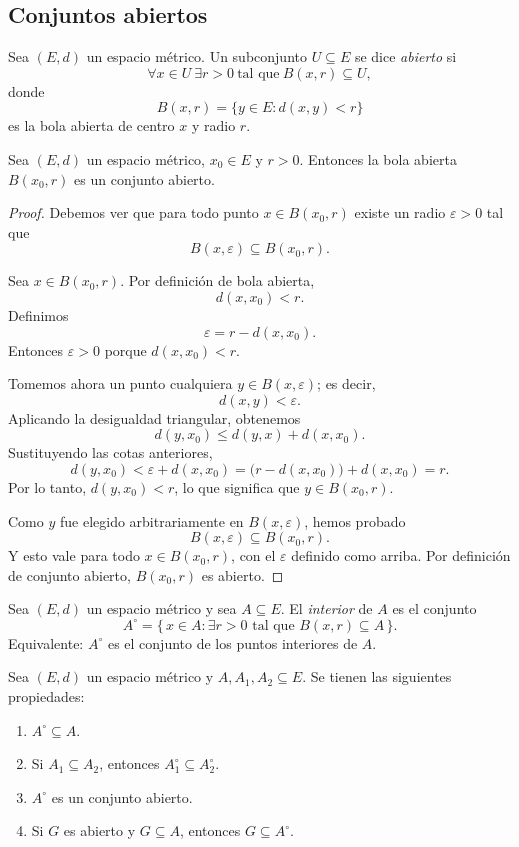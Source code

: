 \subsection{Conjuntos abiertos}

\begin{defi}
Sea $(E,d)$ un espacio métrico. Un subconjunto $U \subseteq E$ se dice
\emph{abierto} si
\[
\forall x \in U\ \exists r > 0 \ \text{tal que} \ B(x,r) \subseteq U,
\]
donde
\[
B(x,r) = \{y \in E : d(x,y) < r\}
\]
es la bola abierta de centro $x$ y radio $r$.
\end{defi}

\begin{prop}
Sea $(E,d)$ un espacio métrico, $x_0 \in E$ y $r>0$.
Entonces la bola abierta $B(x_0,r)$ es un conjunto abierto.
\end{prop}

\begin{proof}
Debemos ver que para todo punto $x \in B(x_0,r)$ existe un radio
$\varepsilon > 0$ tal que
\[
B(x,\varepsilon) \subseteq B(x_0,r).
\]

Sea $x \in B(x_0,r)$. Por definición de bola abierta,
\[
d(x,x_0) < r.
\]
Definimos
\[
\varepsilon = r - d(x,x_0).
\]
Entonces $\varepsilon > 0$ porque $d(x,x_0) < r$.

Tomemos ahora un punto cualquiera $y \in B(x,\varepsilon)$; es decir,
\[
d(x,y) < \varepsilon.
\]
Aplicando la desigualdad triangular, obtenemos
\[
d(y,x_0) \le d(y,x) + d(x,x_0).
\]
Sustituyendo las cotas anteriores,
\[
d(y,x_0) < \varepsilon + d(x,x_0)
= \bigl(r - d(x,x_0)\bigr) + d(x,x_0) = r.
\]
Por lo tanto, $d(y,x_0) < r$, lo que significa que $y \in B(x_0,r)$.

Como $y$ fue elegido arbitrariamente en $B(x,\varepsilon)$, hemos probado
\[
B(x,\varepsilon) \subseteq B(x_0,r).
\]
Y esto vale para todo $x \in B(x_0,r)$, con el $\varepsilon$ definido
como arriba. Por definición de conjunto abierto, $B(x_0,r)$ es abierto.
\end{proof}

\begin{defi}
Sea $(E,d)$ un espacio métrico y sea $A \subseteq E$.
El \emph{interior} de $A$ es el conjunto
\[
A^\circ = \{\,x \in A : \exists r>0 \text{ tal que } B(x,r) \subseteq A\,\}.
\]
Equivalente: $A^\circ$ es el conjunto de los puntos interiores de $A$.
\end{defi}

\begin{prop}
Sea $(E,d)$ un espacio métrico y $A,A_1,A_2 \subseteq E$.
Se tienen las siguientes propiedades:
\begin{enumerate}[label=(\roman*)]
    \item $A^\circ \subseteq A$.
    \item Si $A_1 \subseteq A_2$, entonces $A_1^\circ \subseteq A_2^\circ$.
    \item $A^\circ$ es un conjunto abierto.
    \item Si $G$ es abierto y $G \subseteq A$, entonces $G \subseteq A^\circ$.
\end{enumerate}
\end{prop}

